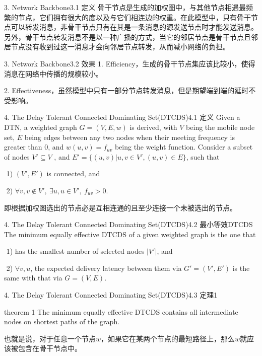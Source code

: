 \documentclass[12pt,aspectratio=43,table]{beamer}
\begin{document}
\begin{frame}{3. Network Backbone}{3.1 定义}
骨干节点是生成的加权图中，与其他节点相遇最频繁的节点，它们拥有很大的度以及与它们相连边的权重。在此模型中，只有骨干节点可以转发消息，非骨干节点只有在其是一条消息的源发送节点时才能发送消息。另外，骨干节点转发消息不是以一种广播的方式，当它的邻居节点是骨干节点且邻居节点没有收到过这一消息才会向邻居节点转发，从而减小网络的负担。
\end{frame}

\begin{frame}{3. Network Backbone}{3.2 效果}
1. Efficiency，生成的骨干节点集应该比较小，使得消息在网络中传播的规模较小。

2. Effectiveness，虽然模型中只有一部分节点转发消息，但是期望端到端的延时不受影响。
\end{frame}

\begin{frame}{\small4. The Delay Tolerant Connected Dominating Set(DTCDS)}{4.1 定义}
Given a DTN, a weighted graph $G = (V,E,w)$ is derived, with $V$ being the mobile node set, $E$ being edges between any two nodes when their meeting frequency is greater than $0$, and $w(u, v) = f_{uv}$ being the weight function. Consider a subset of nodes $V' \subseteq V$ , and $E'= \{(u,v)|u,v \in V',(u, v) \in E\}$, such that

​	1) $(V',E')$ is connected, and

​	2) $\forall v,v\notin V',\ \exists u,u\in V',\ f_{uv}>0$.

即根据加权图选出的节点必是互相连通的且至少连接一个未被选出的节点。
\end{frame}

\begin{frame}{\small4. The Delay Tolerant Connected Dominating Set(DTCDS)}{4.2 最小等效DTCDS}
The minimum equally effective DTCDS of a given weighted graph is the one that

​	1)  has the smallest number of selected nodes $|V'|$, and

​	2)  $\forall v,u$, the expected delivery latency between them via $G'=(V',E')$ is the same with that via $G = (V,E)$.
\end{frame}

\begin{frame}{\small4. The Delay Tolerant Connected Dominating Set(DTCDS)}{4.3 定理1}
\begin{block}{theorem 1}
The minimum equally effective DTCDS contains all intermediate nodes on shortest paths of the graph.
\end{block}
也就是说，对于任意一个节点$w$，如果它在某两个节点的最短路径上，那么$w$就应该被包含在骨干节点中。
\end{frame}
\end{document}
